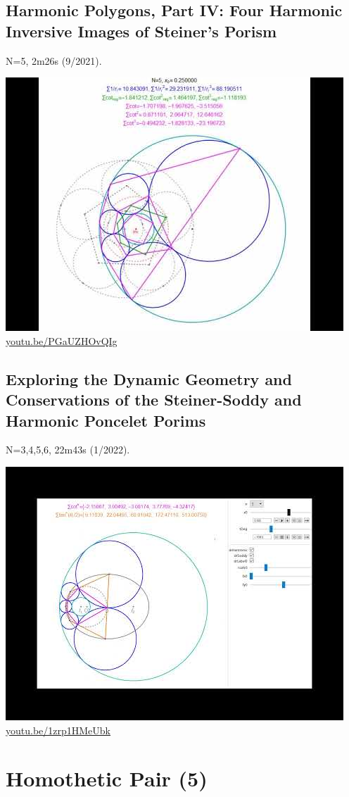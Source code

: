 \documentclass[12pt]{amsart}
\begin{document}
\subsection{Harmonic Polygons, Part IV: Four Harmonic Inversive Images of Steiner's Porism}
\label{vid:PGaUZHOvQIg}
\noindent N=5, 2m26s (9/2021). 
\begin{center}\includegraphics[width=.5\textwidth]{pics/PGaUZHOvQIg.jpg} \\ 
\href{https://youtu.be/PGaUZHOvQIg}{\url{youtu.be/PGaUZHOvQIg}}\end{center}
% 
\subsection{Exploring the Dynamic Geometry and Conservations of the Steiner-Soddy and Harmonic Poncelet Porims}
\label{vid:1zrp1HMeUbk}
\noindent N=3,4,5,6, 22m43s (1/2022). 
\begin{center}\includegraphics[width=.5\textwidth]{pics/1zrp1HMeUbk.jpg} \\ 
\href{https://youtu.be/1zrp1HMeUbk}{\url{youtu.be/1zrp1HMeUbk}}\end{center}
% 

\section{Homothetic Pair (5)}
\end{document}
